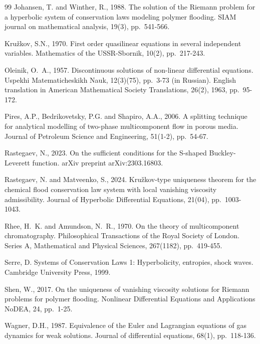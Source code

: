 \documentclass[12pt]{article}
\theoremstyle{definition}
\newenvironment{enbibliography}{\renewcommand{\refname}{{\large\sc References}}\vspace{-0.5cm}\begin{thebibliography}}{\end{thebibliography}}
\begin{document}
\begin{enbibliography}{99}
Johansen, T. and Winther, R., 1988. The solution of the Riemann problem for a hyperbolic system of conservation laws modeling polymer flooding. SIAM journal on mathematical analysis, 19(3), pp.~541-566.

Kru\v{z}kov, S.N., 1970. First order quasilinear equations in several independent variables. Mathematics of the USSR-Sbornik, 10(2), pp.~217-243.

Oleinik, O.~A., 1957. Discontinuous solutions of non-linear differential equations. Uspekhi Matematicheskikh Nauk, 12(3)(75), pp.~3-73 (in Russian). English translation in American Mathematical Society Translations, 26(2), 1963, pp.~95-172.

Pires, A.P., Bedrikovetsky, P.G. and Shapiro, A.A., 2006. A splitting technique for analytical modelling of two-phase multicomponent flow in porous media. Journal of Petroleum Science and Engineering, 51(1-2), pp.~54-67.

Rastegaev, N., 2023. On the sufficient conditions for the S-shaped Buckley-Leverett function. arXiv preprint arXiv:2303.16803.

Rastegaev, N. and Matveenko, S., 2024. Kru\v{z}kov-type uniqueness theorem for the chemical flood conservation law system with local vanishing viscosity admissibility. Journal of Hyperbolic Differential Equations, 21(04), pp.~1003-1043.

Rhee, H.~K. and Amundson, N.~R., 1970. On the theory of multicomponent chromatography. Philosophical Transactions of the Royal Society of London. Series A, Mathematical and Physical Sciences, 267(1182), pp.~419-455.

Serre, D. Systems of Conservation Laws 1: Hyperbolicity, entropies, shock waves. Cambridge University Press, 1999.

Shen, W., 2017. On the uniqueness of vanishing viscosity solutions for Riemann problems for polymer flooding. Nonlinear Differential Equations and Applications NoDEA, 24, pp.~1-25.

Wagner, D.H., 1987. Equivalence of the Euler and Lagrangian equations of gas dynamics for weak solutions. Journal of differential equations, 68(1), pp.~118-136. 

\end{enbibliography}
\end{document}
